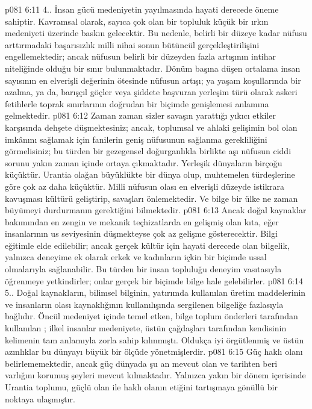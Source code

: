 \vs p081 6:11 4.. İnsan gücü medeniyetin yayılmasında hayati derecede öneme sahiptir. Kavramsal olarak, sayıca çok olan bir topluluk küçük bir ırkın medeniyeti üzerinde baskın gelecektir. Bu nedenle, belirli bir düzeye kadar nüfusu arttırmadaki başarısızlık milli nihai sonun bütüncül gerçekleştirilişini engellemektedir; ancak nüfusun belirli bir düzeyden fazla artışının intihar niteliğinde olduğu bir sınır bulunmaktadır. Dönüm başına düşen ortalama insan sayısının en elverişli değerinin ötesinde nüfusun artışı; ya yaşam koşullarında bir azalma, ya da, barışçıl göçler veya şiddete başvuran yerleşim türü olarak askeri fetihlerle toprak sınırlarının doğrudan bir biçimde genişlemesi anlamına gelmektedir.
\vs p081 6:12 Zaman zaman sizler savaşın yarattığı yıkıcı etkiler karşısında dehşete düşmektesiniz; ancak, toplumsal ve ahlaki gelişimin bol olan imkânını sağlamak için fanilerin geniş nüfusunun sağlanma gerekliliğini görmelisiniz; bu türden bir gezegensel doğurganlıkla birlikte aşı nüfusun ciddi sorunu yakın zaman içinde ortaya çıkmaktadır. Yerleşik dünyaların birçoğu küçüktür. Urantia olağan büyüklükte bir dünya olup, muhtemelen türdeşlerine göre çok az daha küçüktür. Milli nüfusun olası en elverişli düzeyde istikrara kavuşması kültürü geliştirip, savaşları önlemektedir. Ve bilge bir ülke ne zaman büyümeyi durdurmanın gerektiğini bilmektedir.
\vs p081 6:13 Ancak doğal kaynaklar bakımından en zengin ve mekanik teçhizatlarda en gelişmiş olan kıta, eğer insanlarının us seviyesinin düşmekteyse çok az gelişme gösterecektir. Bilgi eğitimle elde edilebilir; ancak gerçek kültür için hayati derecede olan bilgelik, yalnızca deneyime ek olarak erkek ve kadınların içkin bir biçimde ussal olmalarıyla sağlanabilir. Bu türden bir insan topluluğu deneyim vasıtasıyla öğrenmeye yetkindirler; onlar gerçek bir biçimde bilge hale gelebilirler.
\vs p081 6:14 5.. Doğal kaynakların, bilimsel bilginin, yatırımda kullanılan üretim maddelerinin ve insanların olası kaynaklığının kullanılışında sergilenen bilgeliğe fazlasıyla bağlıdır. Öncül medeniyet içinde temel etken, bilge toplum önderleri tarafından kullanılan ; ilkel insanlar medeniyete, üstün çağdaşları tarafından kendisinin kelimenin tam anlamıyla zorla sahip kılınmıştı. Oldukça iyi örgütlenmiş ve üstün azınlıklar bu dünyayı büyük bir ölçüde yönetmişlerdir.
\vs p081 6:15 Güç haklı olanı belirlememektedir, ancak güç dünyada şu an mevcut olan ve tarihten beri varlığını korumuş şeyleri mevcut kılmaktadır. Yalnızca yakın bir dönem içerisinde Urantia toplumu, güçlü olan ile haklı olanın etiğini tartışmaya gönüllü bir noktaya ulaşmıştır.

